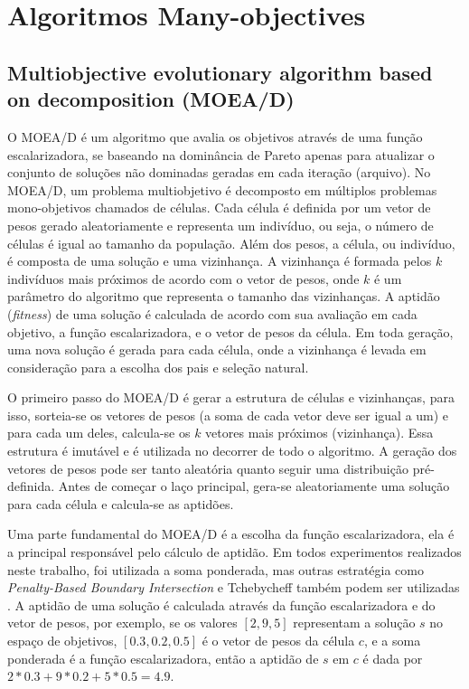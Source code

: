 \section{Algoritmos Many-objectives}

\subsection{Multiobjective evolutionary algorithm based on decomposition (MOEA/D)}

O MOEA/D \cite{Zhang2007} é um algoritmo que avalia os objetivos através de uma função escalarizadora, se baseando na dominância de Pareto apenas para atualizar o conjunto de soluções não dominadas geradas em cada iteração (arquivo). No MOEA/D, um problema multiobjetivo é decomposto em múltiplos problemas mono-objetivos chamados de células. Cada célula é definida por um vetor de pesos gerado aleatoriamente e representa um indivíduo, ou seja, o número de células é igual ao tamanho da população. Além dos pesos, a célula, ou indivíduo, é composta de uma solução e uma vizinhança. A vizinhança é formada pelos $k$ indivíduos mais próximos de acordo com o vetor de pesos, onde $k$ é um parâmetro do algoritmo que representa o tamanho das vizinhanças. A aptidão (\textit{fitness}) de uma solução é calculada de acordo com sua avaliação em cada objetivo, a função escalarizadora, e o vetor de pesos da célula. Em toda geração, uma nova solução é gerada para cada célula, onde a vizinhança é levada em consideração para a escolha dos pais e seleção natural.

O primeiro passo do MOEA/D é gerar a estrutura de células e vizinhanças, para isso, sorteia-se os vetores de pesos (a soma de cada vetor deve ser igual a um) e para cada um deles, calcula-se os $k$ vetores mais próximos (vizinhança). Essa estrutura é imutável e é utilizada no decorrer de todo o algoritmo. A geração dos vetores de pesos pode ser tanto aleatória quanto seguir uma distribuição pré-definida. Antes de começar o laço principal, gera-se aleatoriamente uma solução para cada célula e calcula-se as aptidões. 

Uma parte fundamental do MOEA/D é a escolha da função escalarizadora, ela é a principal responsável pelo cálculo de aptidão. Em todos experimentos realizados neste trabalho, foi utilizada a soma ponderada, mas outras estratégia como \textit{Penalty-Based Boundary Intersection} e Tchebycheff também podem ser utilizadas \cite{Zhang2007}. A aptidão de uma solução é calculada através da função escalarizadora e do vetor de pesos, por exemplo, se os valores $[2, 9, 5]$ representam a solução $s$ no espaço de objetivos, $[0.3, 0.2, 0.5]$ é o vetor de pesos da célula $c$, e a soma ponderada é a função escalarizadora, então a aptidão de $s$ em $c$ é dada por $2 * 0.3 + 9 * 0.2 + 5 * 0.5 = 4.9$.

